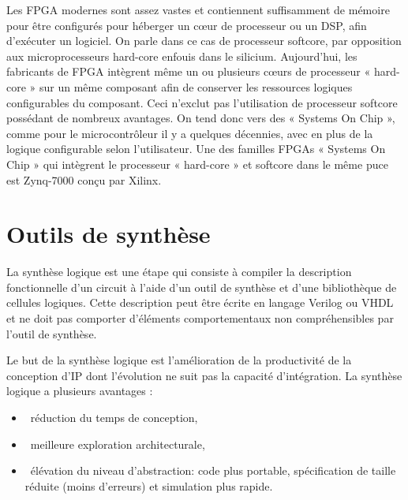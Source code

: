 Les FPGA modernes sont assez vastes et contiennent suffisamment de mémoire pour être configurés 
pour héberger un cœur de processeur ou un DSP, afin d'exécuter un logiciel. 
On parle dans ce cas de processeur softcore, par opposition aux microprocesseurs hard-core enfouis dans le silicium. 
Aujourd'hui, les fabricants de FPGA intègrent même un ou plusieurs cœurs de processeur « hard-core » 
sur un même composant afin de conserver les ressources logiques configurables du composant. 
Ceci n'exclut pas l'utilisation de processeur softcore possédant de nombreux avantages. 
On tend donc vers des « Systems On Chip », comme pour le microcontrôleur il y a quelques décennies, 
avec en plus de la logique configurable selon l'utilisateur. Une des familles FPGAs « Systems On Chip »
qui intègrent le processeur « hard-core » et softcore dans le même puce est Zynq-7000\cite{ug585} conçu par Xilinx.

\section{Outils de synthèse}

La synthèse logique est une étape qui consiste à compiler la description fonctionnelle d'un circuit 
à l'aide d'un outil de synthèse et d'une bibliothèque de cellules logiques. 
Cette description peut être écrite en langage Verilog ou VHDL et ne doit pas comporter d'éléments 
comportementaux non compréhensibles par l'outil de synthèse.

Le but de la synthèse logique est l'amélioration de la productivité de la conception d'IP dont l'évolution ne suit pas la capacité d'intégration\cite{mullercours}.
La synthèse logique a plusieurs avantages :
\begin{itemize}
	\item\ réduction du temps de conception,
	\item\ meilleure exploration architecturale,
	\item\ élévation du niveau d'abstraction: code plus portable, spécification de taille réduite (moins d'erreurs) et simulation plus rapide.
\end{itemize}

